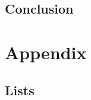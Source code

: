 \documentclass  [
paper    = a4,
BCOR     = 10mm,
twoside,
fontsize = 12pt,
toc      = bibnumbered,
toc      = listofnumbered,
numbers  = noendperiod,
headings = normal,
listof   = leveldown,
version  = 3.03
]                                       {scrreprt}
\begin{document}
	\FloatBarrier
	\chapter{Conclusion}
	

	\part{Appendix}
	\begin{appendix}
		\label{sec::a}
		
		
		\FloatBarrier
		\chapter{Lists}
		\listoffigures
		\listoftables
		
		
		
		
	\end{appendix}
\end{document}
